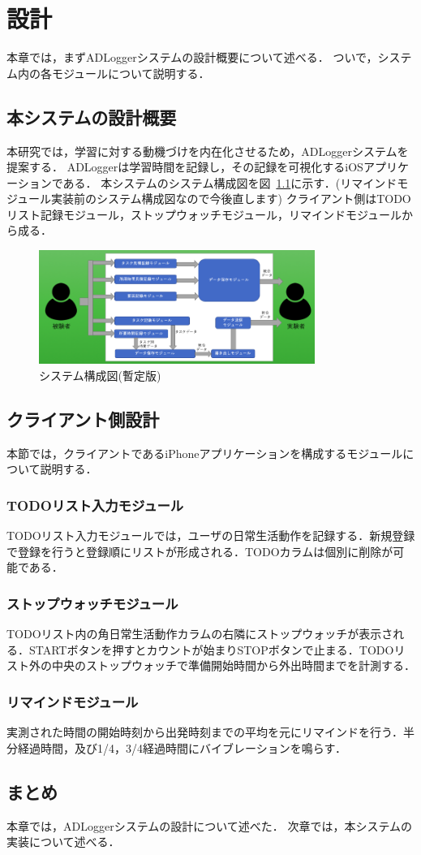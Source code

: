 \chapter{設計}
本章では，まずADLoggerシステムの設計概要について述べる．
ついで，システム内の各モジュールについて説明する．

\section{本システムの設計概要}
本研究では，学習に対する動機づけを内在化させるため，ADLoggerシステムを提案する．
ADLoggerは学習時間を記録し，その記録を可視化するiOSアプリケーションである．
本システムのシステム構成図を図~\ref{fig:system}に示す．(リマインドモジュール実装前のシステム構成図なので今後直します)
クライアント側はTODOリスト記録モジュール，ストップウォッチモジュール，リマインドモジュールから成る．

\begin{figure}[tb]
	\begin{center}
	\includegraphics[width=9cm]{images/5/3.png}
	\end{center}
	\caption{システム構成図(暫定版)}
	\label{fig:system}
\end{figure}

\section{クライアント側設計}
本節では，クライアントであるiPhoneアプリケーションを構成するモジュールについて説明する．

\subsection{TODOリスト入力モジュール}
TODOリスト入力モジュールでは，ユーザの日常生活動作を記録する．新規登録で登録を行うと登録順にリストが形成される．TODOカラムは個別に削除が可能である．
\subsection{ストップウォッチモジュール}
TODOリスト内の角日常生活動作カラムの右隣にストップウォッチが表示される．STARTボタンを押すとカウントが始まりSTOPボタンで止まる．TODOリスト外の中央のストップウォッチで準備開始時間から外出時間までを計測する．
\subsection{リマインドモジュール}
実測された時間の開始時刻から出発時刻までの平均を元にリマインドを行う．半分経過時間，及び1/4，3/4経過時間にバイブレーションを鳴らす．
\section{まとめ}
本章では，ADLoggerシステムの設計について述べた．
次章では，本システムの実装について述べる．